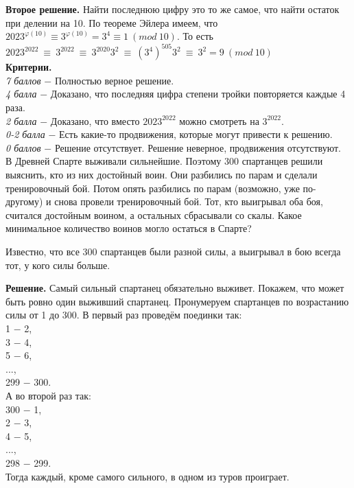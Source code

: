 \textbf{Второе решение.} Найти последнюю цифру это то же самое, что найти остаток при делении на 10. По теореме Эйлера имеем, что $2023^{\varphi (10)} \equiv 3^{\varphi (10)} = 3^4 \equiv 1 \ (mod \ 10)$. То есть $2023^{2022} \ \equiv \ 3^{2022} \  \equiv \  3^{2020}3^2 \ \equiv \ (3^4)^{505}3^2 \ \equiv \ 3^2 = 9 \ (mod \ 10)$ \\ 

\textbf{Критерии.} \\
\textit{7 баллов} $-$ Полностью верное решение. \\
\textit{4 балла} $-$ Доказано, что последняя цифра степени тройки повторяется каждые 4 раза. \\ 
\textit{2 балла} $-$ Доказано, что вместо $2023^{2022}$ можно смотреть на $3^{2022}$.  \\
\textit{0-2 балла} $-$ Есть какие-то продвижения, которые могут привести к решению. \\ 
\textit{0 баллов} $-$ Решение отсутствует. Решение неверное, продвижения отсутствуют. \\ 

 В Древней Спарте выживали сильнейшие. Поэтому 300 спартанцев решили выяснить, кто из них достойный воин. Они разбились по парам и сделали тренировочный бой. Потом опять разбились по парам (возможно, уже по-другому) и снова провели тренировочный бой. Тот, кто выигрывал оба боя, считался достойным воином, а остальных сбрасывали со скалы. Какое минимальное количество воинов могло остаться в Спарте? \par
Известно, что все 300 спартанцев были разной силы, а выигрывал в бою всегда тот, у кого силы больше.\par

\textbf{Решение.} Самый сильный спартанец обязательно выживет.
  Покажем, что может быть ровно один выживший спартанец. Пронумеруем спартанцев по возрастанию силы от 1 до 300. В первый раз проведём поединки так: \\ 1 $-$ 2, \\ 3 $-$ 4, \\ 5 $-$ 6, \\ ..., \\ 299 $-$ 300. \\ А во второй раз так: \\ 300 $-$ 1, \\ 2 $-$ 3, \\ 4 $-$ 5, \\ ..., \\ 298 $-$ 299. \\ Тогда каждый, кроме самого сильного, в одном из туров проиграет. \\ 


